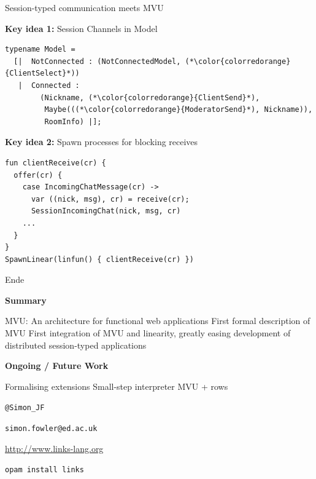 \documentclass[11.5pt, aspectratio=169]{beamer}
\begin{document}
\begin{frame}[fragile]{Session-typed communication meets MVU}

  \begin{fullpageitemize}
  \item { \Large \textbf{Key idea 1:} Session Channels in Model}
\begin{lstlisting}[language=Links]
typename Model =
  [|  NotConnected : (NotConnectedModel, (*\color{colorredorange}{ClientSelect}*))
   |  Connected :
        (Nickname, (*\color{colorredorange}{ClientSend}*),
         Maybe(((*\color{colorredorange}{ModeratorSend}*), Nickname)),
         RoomInfo) |];
\end{lstlisting}
  \item {\Large \textbf{Key idea 2:} Spawn processes for blocking receives}
\begin{lstlisting}[language=Links]
fun clientReceive(cr) {
  offer(cr) {
    case IncomingChatMessage(cr) ->
      var ((nick, msg), cr) = receive(cr);
      SessionIncomingChat(nick, msg, cr)
    ...
  }
}
SpawnLinear(linfun() { clientReceive(cr) })
\end{lstlisting}
  \item
  \end{fullpageitemize}
\end{frame}


\begin{frame}{Ende}

  \begin{fullpageitemize}
    \item { \Large \textbf{Summary} }
        \begin{itemize}
            \itemR MVU: An architecture for functional web applications
            \itemR First formal description of MVU
            \itemR First integration of MVU and linearity, greatly easing development of distributed session-typed applications
        \end{itemize}
%
        \vspace{1em}
      \item {\Large \textbf{Ongoing / Future Work}}
        \begin{itemize}
          \itemR Formalising extensions
          \itemR Small-step interpreter
          \itemR MVU + rows
        \end{itemize}

  \vspace{1em}
  \centering
  \texttt{@Simon\_JF}

  \centering
  \texttt{simon.fowler@ed.ac.uk}

  \centering
  \url{http://www.links-lang.org}

  \centering
  \texttt{opam install links}

 \end{fullpageitemize}
\end{frame}
\end{document}
